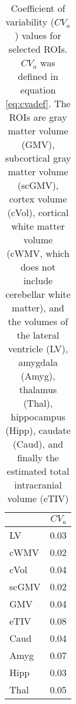 \begin{table}
[]
\centering
\begin{tabular}{lr}
\toprule
{} &   $CV_{a}$ \\
\midrule
LV             &  0.03 \\
cWMV        &  0.02 \\
cVol                     &  0.04 \\
scGMV                &  0.02 \\
GMV                  &  0.04 \\
eTIV &  0.08 \\
Caud                       &  0.04 \\
Amyg                      &  0.07 \\
Hipp                   &  0.03 \\
Thal               &  0.05 \\
\bottomrule
\end{tabular}
\caption{Coefficient of variability ($CV_{a}$) values for selected ROIs. $CV_{a}$ was defined in equation \ref{eq:cvadef}. The ROIs are gray matter volume (GMV), subcortical gray matter volume (scGMV), cortex volume (cVol), cortical white matter volume (cWMV, which does not include cerebellar white matter), and the volumes of the lateral ventricle (LV), amygdala (Amyg), thalamus (Thal), hippocampus (Hipp), caudate (Caud), and finally the estimated total intracranial volume (eTIV)}
\label{tab:cva} 
\end{table}